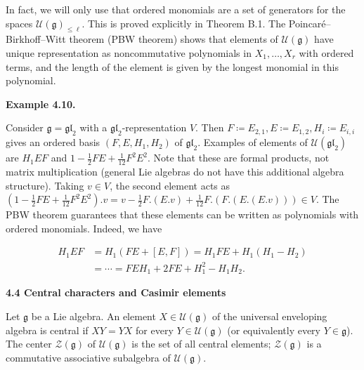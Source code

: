 \documentclass[10pt,a4paper]{article}
\begin{document}
In fact, we will only use that ordered monomials are a set of generators for the spaces $\mathcal{U}(\mathfrak{g})_{\leq\ell}$. This is proved explicitly in Theorem B.1.
The Poincaré–Birkhoff–Witt theorem (PBW theorem) shows that elements of $\mathcal{U}(\mathfrak{g})$ have unique representation as noncommutative polynomials in $X_{1},\dots,X_{r}$ with ordered terms, and the length of the element is given by the longest monomial in this polynomial.





\par\medskip\noindent\textbf{Example 4.10.}\par



Consider $\mathfrak{g}=\mathfrak{gl}_{2}$ with a $\mathfrak{gl}_{2}$-representation $V$.
Then $F\coloneqq E_{2,1},E\coloneqq E_{1,2},H_{i}\coloneqq E_{i,i}$ gives an ordered basis $(F,E,H_{1},H_{2})$ of $\mathfrak{gl}_{2}$.
Examples of elements of $\mathcal{U}(\mathfrak{gl}_{2})$ are $H_{1}EF$ and $1-\tfrac{1}{2}FE+\tfrac{1}{12}F^{2}E^{2}$.
Note that these are formal products, not matrix multiplication (general Lie algebras do not have this additional algebra structure).
Taking $v\in V$, the second element acts as
$(1-\tfrac{1}{2}FE+\tfrac{1}{12}F^{2}E^{2}).v=v-\tfrac{1}{2}F.(E.v)+\tfrac{1}{12}F.(F.(E.(E.v)))\in V$.
The PBW theorem guarantees that these elements can be written as polynomials with ordered monomials. Indeed, we have



\[\begin{aligned}
\displaystyle H_{1}EF & \displaystyle=H_{1}(FE+[E,F])=H_{1}FE+H_{1}(H_{1}-H_{2}) \\
 & \displaystyle=\cdots=FEH_{1}+2FE+H_{1}^{2}-H_{1}H_{2}.\ 
\end{aligned}\]






\par\medskip\noindent\textbf{4.4 Central characters and Casimir elements}\par




Let $\mathfrak{g}$ be a Lie algebra. An element $X\in\mathcal{U}(\mathfrak{g})$ of the universal enveloping algebra is central if $XY=YX$ for every $Y\in\mathcal{U}(\mathfrak{g})$ (or equivalently every $Y\in\mathfrak{g}$). The center $\mathcal{Z}(\mathfrak{g})$ of $\mathcal{U}(\mathfrak{g})$ is the set of all central elements; $\mathcal{Z}(\mathfrak{g})$ is a commutative associative subalgebra of $\mathcal{U}(\mathfrak{g})$.
\end{document}

